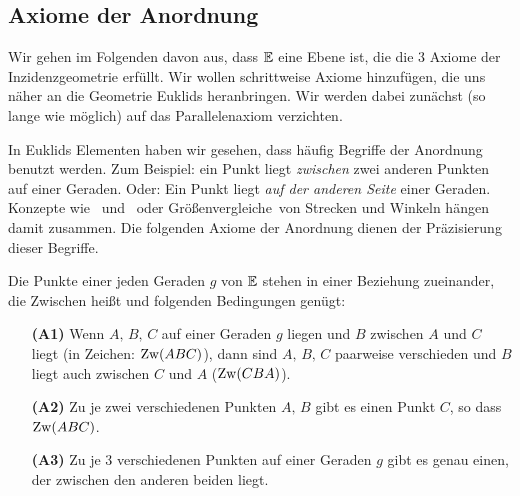 \subsection*{Axiome der Anordnung}





Wir gehen im Folgenden davon aus, dass $\mathbb E$ eine Ebene ist, die die 3
Axiome der Inzidenzgeometrie erfüllt. Wir wollen schrittweise Axiome
hinzufügen, die uns näher an die Geometrie Euklids heranbringen.
Wir werden dabei zunächst (so lange wie möglich) auf das Parallelenaxiom verzichten.




In Euklids Elementen haben wir
gesehen, dass häufig Begriffe der Anordnung benutzt werden. 
Zum Beispiel: \glqq ein Punkt %
liegt {\em zwischen} zwei anderen Punkten %
auf einer Geraden\grqq . 
Oder: \glqq Ein Punkt %
liegt {\em auf der anderen Seite} einer Geraden\grqq .
Konzepte wie \grqq\  und \grqq\
oder \glqq Größenvergleiche\grqq\ von Strecken und Winkeln 
hängen damit zusammen.
Die folgenden Axiome der Anordnung dienen der Präzisierung dieser Begriffe.


Die Punkte einer jeden Geraden $g$ von $\mathbb E$ stehen in einer
Beziehung zueinander, die \glqq{}Zwischen\grqq{} hei{\ss}t
und folgenden Bedingungen gen\"{u}gt:

\begin{enumerate}
    \item[{\bf (A1)}] Wenn $A,\,B,\,C$ auf einer Geraden $g$ liegen und $B$ zwischen $A$ und $C$
    liegt (in Zeichen: $\operatorname{Zw}(ABC)$), dann sind $A,\,B,\,C$ paarweise
    verschieden und $B$ liegt auch zwischen $C$ und $A$ ($\operatorname{Zw}(CBA)$).
    \item[{\bf (A2)}] Zu je zwei verschiedenen Punkten $A,\,B$ gibt es
    einen Punkt $C$, so dass $\operatorname{Zw}(ABC)$.
    \item[{\bf (A3)}] Zu je 3 verschiedenen Punkten auf einer Geraden
    $g$ gibt es genau einen, der zwischen den anderen beiden
    liegt.
\end{enumerate}

